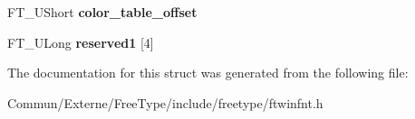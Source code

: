 \begin{DoxyCompactItemize}
\item 
F\+T\+\_\+\+U\+Short {\bfseries color\+\_\+table\+\_\+offset}\hypertarget{struct_f_t___win_f_n_t___header_rec___a83fa51bfd7fe814f8264416204701c60}{}\label{struct_f_t___win_f_n_t___header_rec___a83fa51bfd7fe814f8264416204701c60}

\item 
F\+T\+\_\+\+U\+Long {\bfseries reserved1} \mbox{[}4\mbox{]}\hypertarget{struct_f_t___win_f_n_t___header_rec___af01de9742608fb7a2a603d062f3783e3}{}\label{struct_f_t___win_f_n_t___header_rec___af01de9742608fb7a2a603d062f3783e3}

\end{DoxyCompactItemize}


The documentation for this struct was generated from the following file\+:\begin{DoxyCompactItemize}
\item 
Commun/\+Externe/\+Free\+Type/include/freetype/ftwinfnt.\+h\end{DoxyCompactItemize}
